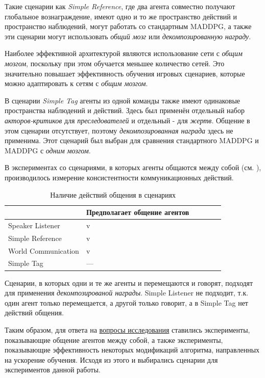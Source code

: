 Такие сценарии как \textit{Simple Reference}, где два агента совместно получают глобальное вознаграждение, имеют одно и то же пространство действий и пространство наблюдений, могут работать со стандартным MADDPG, а также эти сценарии могут использовать \textit{общий мозг} или \textit{декомпозированную награду}.

Наиболее эффективной архитектурой являются использование сети с \textit{общим мозгом}, поскольку при этом обучается меньшее количество сетей. Это значительно повышает эффективность обучения игровых сценариев, которые можно адаптировать к сетям с \textit{общим мозгом}.

В сценарии \textit{Simple Tag} агенты из одной команды также имеют одинаковые пространства наблюдений и действий. Здесь был применён отдельный набор \textit{акторов-критиков} для \textit{преследователей} и отдельный - для \textit{жертв}. Общение в этом сценарии отсутствует, поэтому \textit{декомпозированная награда} здесь не применима. Этот сценарий был выбран для сравнения стандартного MADDPG и MADDPG с \textit{одним мозгом}.

В экспериментах со сценариями, в которых агенты общаются между собой (см. ), производилось измерение консистентности коммуникационных действий.

\begin{table}[t!]
	\centering\small
	\caption{Наличие действий общения в сценариях}
	\label{tab-communicational-scenarious}
	\begin{tabular}{|l|l|l|l|l|l|}
		\hline
		& Предполагает общение агентов\\
		\hline
		Speaker Listener    & v \\ 
		\hline
		Simple Reference    & v \\ 
		\hline
		World Communication & v \\ 
		\hline
		Simple Tag          & --- \\ 
		\hline
	\end{tabular}
	\normalsize%
\end{table}

Сценарии, в которых одни и те же агенты и перемещаются и говорят, подходят для применения \textit{декомпозированой награды}. Simple Listener не подходит, т.к. один агент только перемещается, а другой только говорит, а в Simple Tag нет действий общения.

Таким образом, для ответа на \hyperref[intro-questions]{вопросы исследования} ставились эксперименты, показывающие общение агентов между собой, а также эксперименты, показывающие эффективность некоторых модификаций алгоритма, направленных на ускорение обучения. Исходя из этого и выбирались сценарии для экспериментов данной работы.

\newpage
